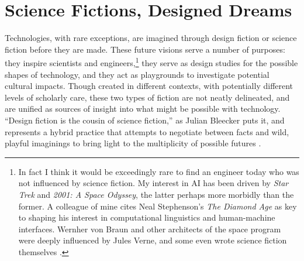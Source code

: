\chapter{Science Fictions, Designed Dreams}
\label{chap:2}













Technologies, with rare exceptions, are imagined through design
fiction or science fiction before they are made. These future
visions serve a number of purposes:  they inspire scientists and
engineers,\footnote{In fact I think it would be exceedingly rare to
  find an engineer today who was not influenced by science fiction. My
  interest in AI has been driven by \emph{Star Trek} and \emph{2001: A
  Space Odyssey}, the latter perhaps more morbidly than the former. A
  colleague of mine cites Neal Stephenson's
  \emph{The Diamond Age} as key to shaping his interest in
  computational linguistics and human-machine interfaces. Wernher von
  Braun and other architects of the space program were deeply
  influenced by Jules Verne, and some even wrote science fiction
  themselves \cite[p. 2]{marketingMoon}.} they serve as design
studies for the possible shapes of technology, and they act as
playgrounds to investigate potential cultural impacts.
Though created in different contexts, with potentially 
different levels of scholarly care, these two types of fiction are not
neatly delineated, and are unified as sources of insight into what
might be possible with technology. ``Design fiction is the cousin of
science fiction,'' as Julian Bleecker puts it, and represents a hybrid
practice that attempts to negotiate between facts and wild, playful
imaginings to bring light to the multiplicity of possible
futures \cite[p. 8]{bleecker}. 

